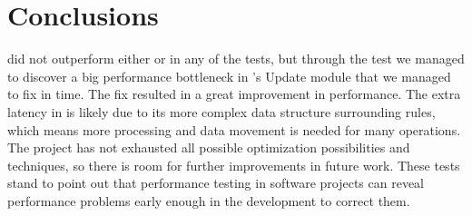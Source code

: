 \section{Conclusions}
\snowman{} did not outperform either \bhtb{} or \snortmanager{} in any of the
tests, but through the test we managed to discover a big performance bottleneck
in \snowman{}'s Update module that we managed to fix in time. The fix resulted
in a great improvement in performance. The extra latency in \snowman{} is likely
due to its more complex data structure surrounding rules, which means more
processing and data movement is needed for many operations. The project has not
exhausted all possible optimization possibilities and techniques, so there is
room for further improvements in future work. These tests stand to point out
that performance testing in software projects can reveal performance problems
early enough in the development to correct them.